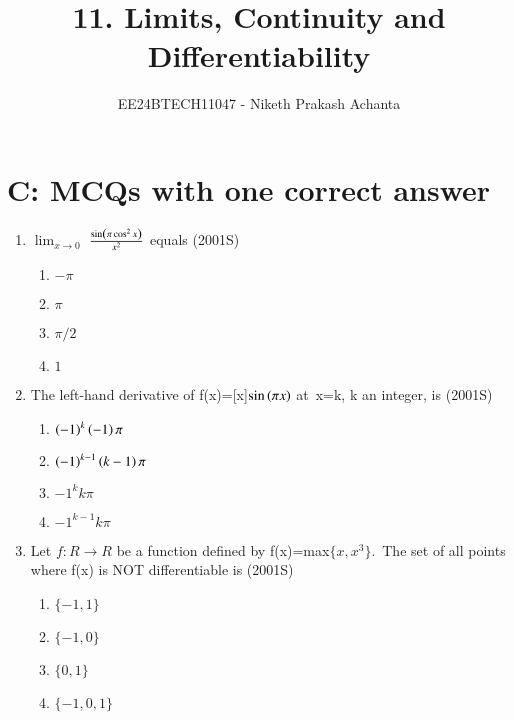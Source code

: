 \documentclass[journal,12pt,twocolumn]{IEEEtran}
\theoremstyle{remark}
\begin{document}

\vspace{3cm}

\title{11. Limits, Continuity and Differentiability}
\author{EE24BTECH11047 - Niketh Prakash Achanta}
\maketitle
\newpage
\bigskip
\section{C: MCQs with one correct answer}

\renewcommand{\thefigure}{\theenumi}
\renewcommand{\thetable}{\theenumi}
\begin{enumerate}
\item %

	$\lim_{x\to0}$  $\frac{\sin\left(\pi \cos^2 x \right)}{x^2}$ \: equals \hfill{(2001S)}
    \begin{enumerate}
     \item $-\pi$
     \item $\pi$
     \item $\pi/2$
     \item $1$\\
     \end{enumerate}

\item %
	The left-hand derivative of f(x)=[x]$\sin\left(\pi x\right)$ at\ x=k, k an integer, is \hfill{(2001S)}
    \begin{enumerate}
	    \item $\left(-1\right)^k \left(-1\right) \pi$
	    \item $\left(-1\right)^{k-1}\left(k-1\right) \pi$
            \item $-1^k k\pi$
     	    \item $-1^{k-1} k\pi$\\
    \end{enumerate}

\item %

    Let $f:R\rightarrow R$ be a function defined by f(x)=max$\{x,x^3\}$.\ The set of all points where f(x) is NOT differentiable is \hfill{(2001S)}
    \begin{enumerate}
     \item $\{-1,1\}$
     \item $\{-1,0\}$
     \item $\{0,1\}$
     \item $\{-1,0,1\}$\\
    \end{enumerate}



\end{enumerate}
\end{document}
